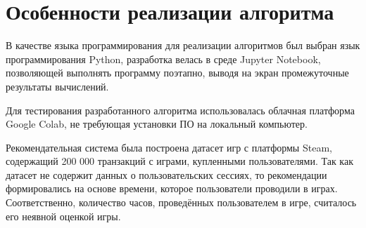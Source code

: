 \chapter{Особенности реализации алгоритма}

В качестве языка программирования для реализации алгоритмов был выбран язык программирования Python, разработка велась в среде Jupyter Notebook, позволяющей выполнять программу поэтапно, выводя на экран промежуточные результаты вычислений.

Для тестирования разработанного алгоритма использовалась облачная платформа Google Colab, не требующая установки ПО на локальный компьютер.

Рекомендательная система была построена датасет игр с платформы Steam, содержащий 200 000 транзакций с играми, купленными пользователями. Так как датасет не содержит данных о пользовательских сессиях, то рекомендации формировались на основе времени, которое пользователи проводили в играх. Соответственно, количество часов, проведённых пользователем в игре, считалось его неявной оценкой игры.

\clearpage

